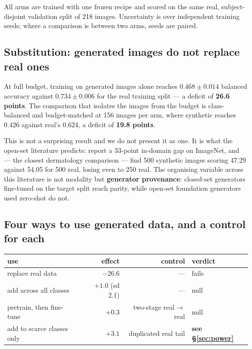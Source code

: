 \documentclass[11pt]{article}
\begin{document}
All arms are trained with one frozen recipe and scored on the same real, subject-disjoint
validation split of 218 images. Uncertainty is over independent training seeds; where a
comparison is between two arms, seeds are paired.

\subsection{Substitution: generated images do not replace real ones}

At full budget, training on generated images alone reaches $0.468 \pm 0.014$ balanced
accuracy against $0.734 \pm 0.006$ for the real training split --- a deficit of
\textbf{26.6 points}. The comparison that isolates the images from the budget is
class-balanced and budget-matched at 156 images per arm, where synthetic reaches $0.426$
against real's $0.624$, a deficit of \textbf{19.8 points}.

This is not a surprising result and we do not present it as one. It is what the open-set
literature predicts: \citet{sariyildiz2023} report a 33-point in-domain gap on ImageNet,
and \citet{akrout2023} --- the closest dermatology comparison --- find 500 synthetic images
scoring 47.29 against 54.05 for 500 real, losing even to 250 real. The organising variable
across this literature is not modality but \textbf{generator provenance}: closed-set
generators fine-tuned on the target split reach parity, while open-set foundation generators
used zero-shot do not.

\subsection{Four ways to use generated data, and a control for each}

\begin{center}
\begin{tabular}{lrrl}
\toprule
use & effect & control & verdict \\
\midrule
replace real data & $-26.6$ & --- & fails \\
add across all classes & $+1.0$ (sd 2.1) & --- & null \\
pretrain, then fine-tune & $+0.3$ & two-stage real$\rightarrow$real & null \\
add to scarce classes only & $+3.1$ & duplicated real tail & \textbf{see \S\ref{sec:power}} \\
\bottomrule
\end{tabular}
\end{center}
\end{document}
